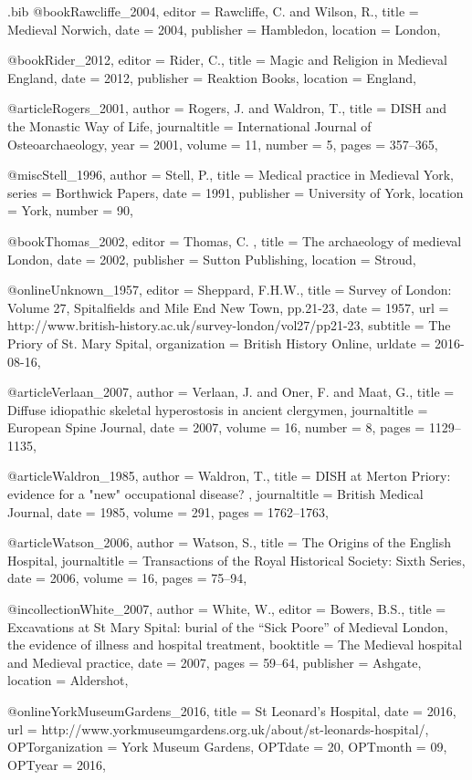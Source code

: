 \begin{filecontents}{\IJSRAidentifier.bib}
@book{Rawcliffe_2004,
	editor = {Rawcliffe, C. and Wilson, R.},
	title = {Medieval Norwich},
	date = {2004},
	publisher = {Hambledon},
	location = {London},
}

@book{Rider_2012,
	editor = {Rider, C.},
	title = {Magic and Religion in Medieval England},
	date = {2012},
	publisher = {Reaktion Books},
	location = {England},
}

@article{Rogers_2001,
	author = {Rogers, J. and Waldron, T.},
	title = {DISH and the Monastic Way of Life},
	journaltitle = {International Journal of Osteoarchaeology},
	year = {2001},
	volume = {11},
	number = {5},
	pages = {357--365},
}

@misc{Stell_1996,
	author = {Stell, P.},
	title = {Medical practice in Medieval York},
	series = {Borthwick Papers},
	date = {1991},
	publisher = {University of York},
	location = {York},
	number = {90},
}

@book{Thomas_2002,
	editor = {Thomas, C. },
	title = {The archaeology of medieval London},
	date = {2002},
	publisher = {Sutton Publishing},
	location = {Stroud},
}

@online{Unknown_1957,
	editor = {Sheppard, F.H.W.},
	title = {Survey of London: Volume 27, Spitalfields and Mile End New Town, pp.21-23},
	date = {1957},
	url = {http://www.british-history.ac.uk/survey-london/vol27/pp21-23},
	subtitle = {The Priory of St. Mary Spital},
	organization = {British History Online},
	urldate = {2016-08-16},
}

@article{Verlaan_2007,
	author = {Verlaan, J. and Oner, F. and Maat, G.},
	title = {Diffuse idiopathic skeletal hyperostosis in ancient clergymen},
	journaltitle = {European Spine Journal},
	date = {2007},
	volume = {16},
	number = {8},
	pages = {1129--1135},
}

@article{Waldron_1985,
	author = {Waldron, T.},
	title = {DISH at Merton Priory: evidence for a "new" occupational disease? },
	journaltitle = {British Medical Journal},
	date = {1985},
	volume = {291},
	pages = {1762--1763},
}

@article{Watson_2006,
	author = {Watson, S.},
	title = {The Origins of the English Hospital},
	journaltitle = {Transactions of the Royal Historical Society: Sixth Series},
	date = {2006},
	volume = {16},
	pages = {75--94},
}

@incollection{White_2007,
	author = {White, W.},
	editor = {Bowers, B.S.},
	title = {Excavations at St Mary Spital: burial of the “Sick Poore” of Medieval London, the evidence of illness and hospital treatment},
	booktitle = {The Medieval hospital and Medieval practice},
	date = {2007},
	pages = {59--64},
	publisher = {Ashgate},
	location = {Aldershot},
}

@online{YorkMuseumGardens_2016,
	title = {St Leonard’s Hospital},
	date = {2016},
	url = {http://www.yorkmuseumgardens.org.uk/about/st-leonards-hospital/},
	OPTorganization = {York Museum Gardens},
	OPTdate = {20},
	OPTmonth = {09},
	OPTyear = {2016},
}


\end{filecontents}
